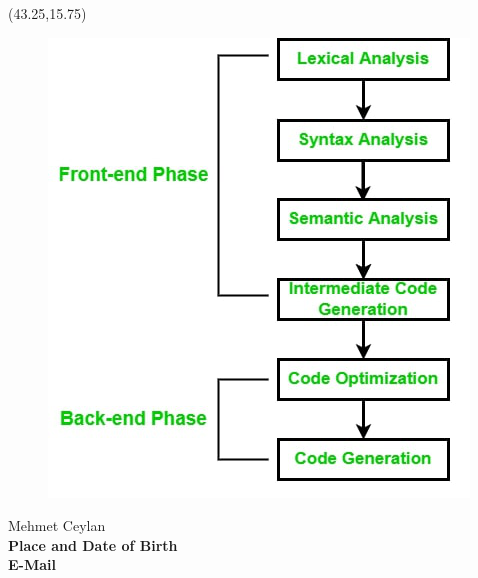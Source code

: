 \vspace*{10mm}
\setlength{\TPHorizModule}{10pt}
\setlength{\TPVertModule}{10pt}
\begin{textblock}{1}(43.25,15.75) %
	\begin{figure}[p]
		\includegraphics[scale=0.35,keepaspectratio=true]{cv-photo/emre.png}
	\end{figure}	
\end{textblock}
\vspace*{20mm}
\textbf{\makebox[1.6cm]{\hfill \textbf{:}}}\hspace{0.225em} Mehmet Ceylan \\ %

\textbf{Place and Date of Birth\makebox[0.735cm]{\hfill \textbf{:}}}\hspace{0.225em} \\ %

\textbf{E-Mail\makebox[3.685cm]{\hfill \textbf{:}}}\hspace{0.225em} \\ %

\vspace{5mm}

\renewcommand\labelitemi{\normalsize$\bullet$} 			%

